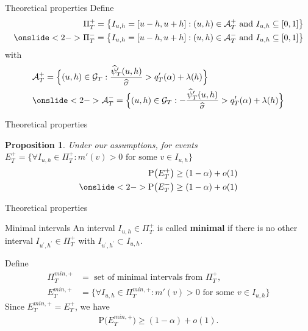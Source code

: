 \documentclass[10pt, handout]{beamer}
\newcommand{\Prob}{\mathrm{P}}
\newtheorem{prop}{Proposition}
\begin{document}
\begin{frame}{Theoretical properties}
Define
\begin{align*}
\Pi_T^+ = \big\{ I_{u,h} = [u-h,u+h]: (u,h) \in \mathcal{A}_T^+ \text{ and } I_{u, h} \subseteq [0,1] \big\}\\
\onslide<2->{\Pi_T^- = \big\{ I_{u,h} = [u-h,u+h]: (u,h) \in \mathcal{A}_T^- \text{ and } I_{u, h} \subseteq [0,1] \big\}}
\end{align*}
\vspace{-5mm}
with
\begin{align*} 
&\mathcal{A}_T^+ = \Big\{ (u,h) \in \mathcal{G}_T: \frac{\widehat{\psi}^{\prime}_T(u,h)}{\widehat{\sigma}} > q^{\prime}_T(\alpha)  + \lambda(h)  \Big\}\\
&\onslide<2->{\mathcal{A}_T^- = \Big\{ (u,h) \in \mathcal{G}_T: -\frac{\widehat{\psi}^{\prime}_T(u,h)}{\widehat{\sigma}} > q^{\prime}_T(\alpha)  + \lambda(h)  \Big\}}
\end{align*}
\end{frame}

\begin{frame}{Theoretical properties}
\begin{prop}\label{prop-shape-3}
Under our assumptions, for events $E_T^+ = \Big\{ \forall I_{u,h} \in \Pi_T^+: m'(v) > 0 \text{ for some } v \in I_{u,h}\Big\}$
\begin{align*}
\Prob \big( E_T^+ \big) \ge (1-\alpha) + o(1)\\
\onslide<2->{\Prob \big( E_T^- \big) \ge (1-\alpha) + o(1)}
\end{align*} 
\end{prop}
\end{frame}

\begin{frame}{Theoretical properties}
\begin{block}{Minimal intervals}
An interval $I_{u, h} \in \Pi^+_T$ is called \textbf{minimal} if there is no other interval $I_{u^\prime, h^\prime} \in \Pi^+_T$ with $I_{u^\prime, h^\prime} \subset I_{u, h}$.
\end{block}\pause
\vspace{-3mm}
Define
\begin{align*}
\Pi^{min, +}_T &= \text{ set of minimal intervals from }\Pi^+_T,\\
E_T^{min, +} &= \Big\{ \forall I_{u,h} \in \Pi_T^{min, +}: m'(v) > 0 \text{ for some } v \in I_{u,h}\Big\}
\end{align*}\pause
Since $E_T^{min, +} = E_T^{+}$, we have
\begin{align*}
\Prob \big( E_T^{min, +} \big) \ge (1-\alpha) + o(1).
\end{align*}
\end{frame}
\end{document}
